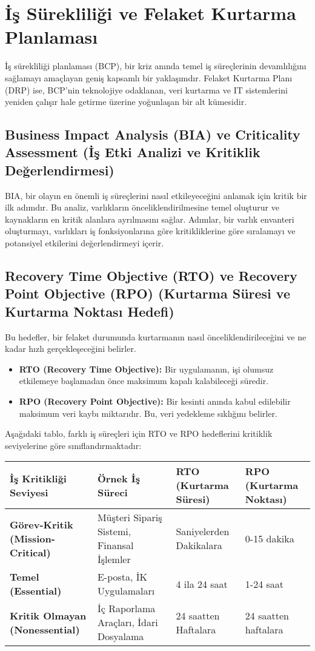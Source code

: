 \section{İş Sürekliliği ve Felaket Kurtarma Planlaması}

İş sürekliliği planlaması (BCP), bir kriz anında temel iş süreçlerinin devamlılığını sağlamayı amaçlayan geniş kapsamlı bir yaklaşımdır. Felaket Kurtarma Planı (DRP) ise, BCP'nin teknolojiye odaklanan, veri kurtarma ve IT sistemlerini yeniden çalışır hale getirme üzerine yoğunlaşan bir alt kümesidir.

\subsection{Business Impact Analysis (BIA) ve Criticality Assessment (İş Etki Analizi ve Kritiklik Değerlendirmesi)}

BIA, bir olayın en önemli iş süreçlerini nasıl etkileyeceğini anlamak için kritik bir ilk adımdır. Bu analiz, varlıkların önceliklendirilmesine temel oluşturur ve kaynakların en kritik alanlara ayrılmasını sağlar. Adımlar, bir varlık envanteri oluşturmayı, varlıkları iş fonksiyonlarına göre kritikliklerine göre sıralamayı ve potansiyel etkilerini değerlendirmeyi içerir.

\subsection{Recovery Time Objective (RTO) ve Recovery Point Objective (RPO) (Kurtarma Süresi ve Kurtarma Noktası Hedefi)}

Bu hedefler, bir felaket durumunda kurtarmanın nasıl önceliklendirileceğini ve ne kadar hızlı gerçekleşeceğini belirler.
\begin{itemize}
    \item \textbf{RTO (Recovery Time Objective):} Bir uygulamanın, işi olumsuz etkilemeye başlamadan önce maksimum kapalı kalabileceği süredir.
    \item \textbf{RPO (Recovery Point Objective):} Bir kesinti anında kabul edilebilir maksimum veri kaybı miktarıdır. Bu, veri yedekleme sıklığını belirler.
\end{itemize}

Aşağıdaki tablo, farklı iş süreçleri için RTO ve RPO hedeflerini kritiklik seviyelerine göre sınıflandırmaktadır:

\begin{tabular}{|l|l|l|l|}
\hline
İş Kritikliği Seviyesi & Örnek İş Süreci & RTO (Kurtarma Süresi) & RPO (Kurtarma Noktası) \\
\hline
\textbf{Görev-Kritik (Mission-Critical)} & Müşteri Sipariş Sistemi, Finansal İşlemler & Saniyelerden Dakikalara & 0-15 dakika \\
\hline
\textbf{Temel (Essential)} & E-posta, İK Uygulamaları & 4 ila 24 saat & 1-24 saat \\
\hline
\textbf{Kritik Olmayan (Nonessential)} & İç Raporlama Araçları, İdari Dosyalama & 24 saatten Haftalara & 24 saatten haftalara \\
\hline
\end{tabular}

